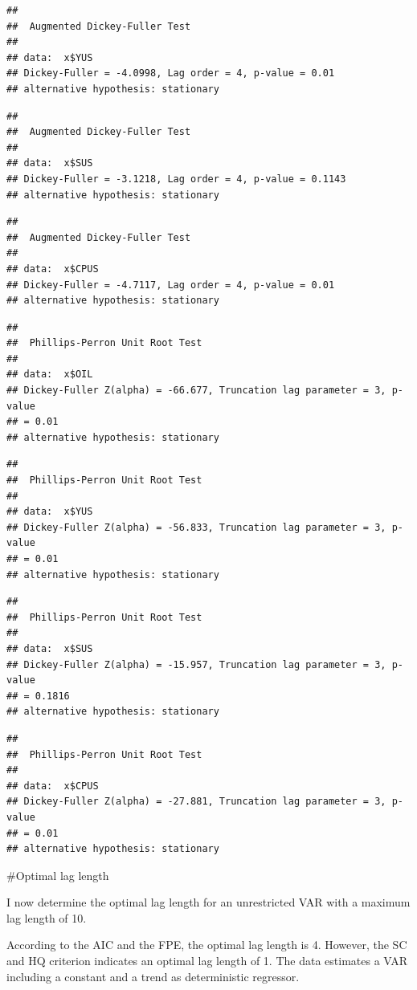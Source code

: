 \documentclass[11pt,preprint, authoryear]{elsarticle}
\numberwithin{equation}{section}
\numberwithin{figure}{section}
\numberwithin{table}{section}
\begin{document}
\begin{verbatim}
## 
##  Augmented Dickey-Fuller Test
## 
## data:  x$YUS
## Dickey-Fuller = -4.0998, Lag order = 4, p-value = 0.01
## alternative hypothesis: stationary
\end{verbatim}

\begin{verbatim}
## 
##  Augmented Dickey-Fuller Test
## 
## data:  x$SUS
## Dickey-Fuller = -3.1218, Lag order = 4, p-value = 0.1143
## alternative hypothesis: stationary
\end{verbatim}

\begin{verbatim}
## 
##  Augmented Dickey-Fuller Test
## 
## data:  x$CPUS
## Dickey-Fuller = -4.7117, Lag order = 4, p-value = 0.01
## alternative hypothesis: stationary
\end{verbatim}

\begin{verbatim}
## 
##  Phillips-Perron Unit Root Test
## 
## data:  x$OIL
## Dickey-Fuller Z(alpha) = -66.677, Truncation lag parameter = 3, p-value
## = 0.01
## alternative hypothesis: stationary
\end{verbatim}

\begin{verbatim}
## 
##  Phillips-Perron Unit Root Test
## 
## data:  x$YUS
## Dickey-Fuller Z(alpha) = -56.833, Truncation lag parameter = 3, p-value
## = 0.01
## alternative hypothesis: stationary
\end{verbatim}

\begin{verbatim}
## 
##  Phillips-Perron Unit Root Test
## 
## data:  x$SUS
## Dickey-Fuller Z(alpha) = -15.957, Truncation lag parameter = 3, p-value
## = 0.1816
## alternative hypothesis: stationary
\end{verbatim}

\begin{verbatim}
## 
##  Phillips-Perron Unit Root Test
## 
## data:  x$CPUS
## Dickey-Fuller Z(alpha) = -27.881, Truncation lag parameter = 3, p-value
## = 0.01
## alternative hypothesis: stationary
\end{verbatim}

\#Optimal lag length

I now determine the optimal lag length for an unrestricted VAR with a
maximum lag length of 10.

According to the AIC and the FPE, the optimal lag length is 4. However,
the SC and HQ criterion indicates an optimal lag length of 1. The data
estimates a VAR including a constant and a trend as deterministic
regressor.
\end{document}
